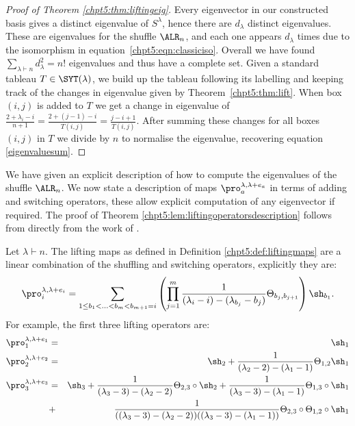\documentclass[11pt]{report}
\begin{document}
\begin{proof}[Proof of Theorem \ref{chpt5:thm:liftingeig}]
	Every eigenvector in our constructed basis gives a distinct eigenvalue 
	of $S^{\lambda}$, hence there are $d_{\lambda}$ distinct eigenvalues. 
	These are eigenvalues for the shuffle $\ALR_{n}$, and each one appears 
	$d_{\lambda}$ times due to the isomorphism in 
	equation~\eqref{chpt5:eqn:classiciso}. 
	Overall we have found $\sum_{\lambda \vdash n} 
	d_{\lambda}^{2} = n!$	eigenvalues and thus have a complete set.	Given a standard tableau $T \in \SYT(\lambda)$, we build up the tableau following its 
	labelling and keeping 
	track of the changes in eigenvalue given by Theorem~\ref{chpt5:thm:lift}. 
	When box 
	$(i,j)$ is added to $T$ we get a change in eigenvalue of 
	$\frac{2+\lambda_{i}-i}{n+1} = 	\frac{2 + (j-1) -i}{T(i,j)} = \frac{j-i+1}{T(i,j)}$. After summing these	changes for all boxes $(i,j)$ in $T$ we divide by $n$ to normalise the eigenvalue, recovering equation \ref{eigenvaluesum}.
\end{proof}

We have given an explicit description of how to compute the eigenvalues of the shuffle $\ALR_{n}$. We now state a description of maps $\pro_{a}^{\lambda,\lambda+e_{a}}$ in terms of adding and switching operators, these allow explicit computation of any eigenvector if required. The proof of Theorem \ref{chpt5:lem:liftingoperatorsdescription} follows from directly from the work of \cite[Section 5.6]{dieker2018spectral}.

\begin{lemma}
	\label{chpt5:lem:liftingoperatorsdescription}
	Let $\lambda \vdash n$. The lifting maps as defined in Definition 
	\ref{chpt5:def:liftingmaps} are a linear combination of the shuffling and switching operators, explicitly they are:	
	\begin{eqnarray}
	\pro_{i}^{\lambda,\lambda+e_{i}} = \sum_{1\leq b_{1} <\ldots <b_{m} <b_{m+1}=i} \left( \prod_{j=1}^{m} \frac{1}{(\lambda_{i} -i) - (\lambda_{b_{j}} -b_{j})}\Theta_{b_{j},b_{j+1}} \right) \sh_{b_{1}}.	
	\end{eqnarray}
	For example, the first three lifting operators are:
	\begin{eqnarray*}
		\pro_{1}^{\lambda,\lambda+e_{1}} & = & \sh_{1} \\
		\pro_{2}^{\lambda,\lambda+e_{2}} & = &\sh_{2} + \frac{1}{(\lambda_{2}-2) - (\lambda_{1}-1)}\Theta_{1,2} \sh_{1} \\
		\pro_{3}^{\lambda,\lambda+e_{3}} & = & \sh_{3} + \frac{1}{(\lambda_{3} - 3) - (\lambda_{2}-2)} \Theta_{2,3} \circ\sh_{2} + \frac{1}{(\lambda_{3} - 3) - (\lambda_{1}-1)} \Theta_{1,3} \circ \sh_{1} \\
		& + &\frac{1}{((\lambda_{3} - 3) - (\lambda_{2}-2))((\lambda_{3} - 3) - (\lambda_{1}-1))}\Theta_{2,3} \circ \Theta_{1,2} \circ \sh_{1}
	\end{eqnarray*}
\end{lemma}
\end{document}
